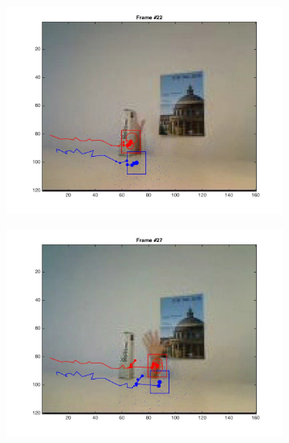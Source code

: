 \documentclass{ethz_report}
\begin{document}
\begin{figure}[h]
\begin{subfigure}[b]{.25\textwidth}
        \includegraphics[width=1\linewidth]{images/video2_model_21}
    \end{subfigure}%
    \begin{subfigure}[b]{.25\textwidth}
        \centering
        \includegraphics[width=1\linewidth]{images/video2_model_26}
    \end{subfigure}%
    \begin{subfigure}[b]{.25\textwidth}
        \centering

\end{subfigure}
\end{figure}
\end{document}
